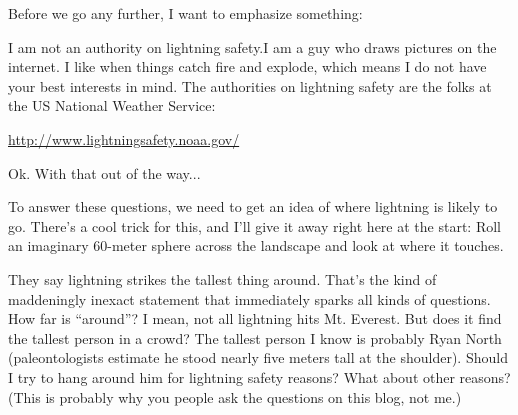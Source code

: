 \hfill{}


\hfill{}


\hfill{}


\hfill{}


\hfill{}


\hfill{}

{Before we go any further, I want to emphasize something:}

{I am not an authority on lightning safety.I am a guy who draws pictures on the internet. I like when things catch fire and explode, which means I do not have your best interests in mind. The authorities on lightning safety are the folks at the US National Weather Service:}

{ \href{http://www.lightningsafety.noaa.gov/}{http://www.lightningsafety.noaa.gov/}}

{Ok. With that out of the way...}

{To answer these questions, we need to get an idea of where lightning is likely to go. There’s a cool trick for this, and I’ll give it away right here at the start: Roll an imaginary 60-meter sphere across the landscape and look at where it touches.}

{They say lightning strikes the tallest thing around. That’s the kind of maddeningly inexact statement that immediately sparks all kinds of questions. How far is “around”? I mean, not all lightning hits Mt. Everest. But does it find the tallest person in a crowd? The tallest person I know is probably Ryan North (paleontologists estimate he stood nearly five meters tall at the shoulder). Should I try to hang around him for lightning safety reasons? What about other reasons? (This is probably why you people ask the questions on this blog, not me.)}

